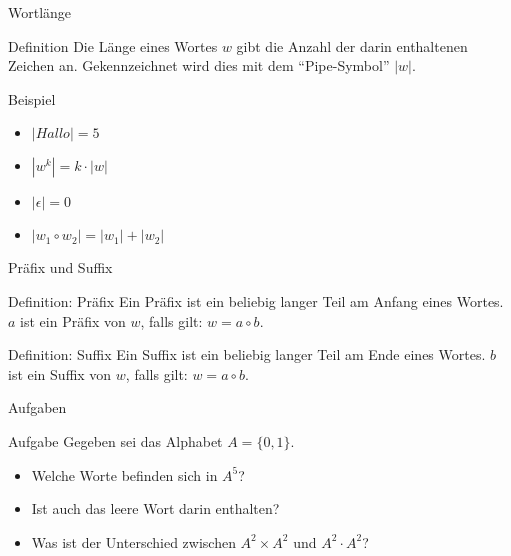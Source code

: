 \begin{frame}{Wortlänge}
    \begin{block}{Definition}
        Die Länge eines Wortes $w$ gibt die Anzahl der darin enthaltenen Zeichen an. Gekennzeichnet wird dies mit dem "`Pipe-Symbol"' $\left| w \right|$.
    \end{block}
    \begin{exampleblock}{Beispiel}
        \begin{itemize}
            \item $\left| Hallo\right| = 5$
                \pause
            \item $\left| w^k\right| = k\cdot \left| w\right|$
                \pause
            \item $\left| \epsilon\right| = 0$
                \pause
            \item $\left| w_1 \circ w_2 \right| = \left| w_1\right| + \left| w_2\right|$
        \end{itemize}
    \end{exampleblock}
\end{frame}

\begin{frame}{Präfix und Suffix}
    \begin{block}{Definition: Präfix}
        Ein Präfix ist ein beliebig langer Teil am Anfang eines Wortes. $a$ ist ein Präfix von $w$, falls gilt: $w = a \circ b$.
    \end{block}
    \pause
    \begin{block}{Definition: Suffix}
        Ein Suffix ist ein beliebig langer Teil am Ende eines Wortes. $b$ ist ein Suffix von $w$, falls gilt: $w = a\circ b$.
    \end{block}
\end{frame}

\begin{frame}{Aufgaben}
    \begin{exampleblock}{Aufgabe}
        Gegeben sei das Alphabet $A = \{ 0, 1\}$.
        \begin{itemize}
            \item Welche Worte befinden sich in $A^5$?
                \pause
            \item Ist auch das leere Wort darin enthalten?
                \pause
            \item Was ist der Unterschied zwischen $A^2 \times A^2$ und $A^2 \cdot A^2$?
        \end{itemize}
    \end{exampleblock}
\end{frame}

